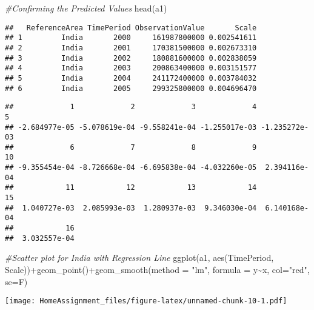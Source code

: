 \documentclass[
]{article}
\newenvironment{Shaded}{\begin{snugshade}}{\end{snugshade}}
\newcommand{\AttributeTok}[1]{\textcolor[rgb]{0.77,0.63,0.00}{#1}}
\newcommand{\CommentTok}[1]{\textcolor[rgb]{0.56,0.35,0.01}{\textit{#1}}}
\newcommand{\FunctionTok}[1]{\textcolor[rgb]{0.00,0.00,0.00}{#1}}
\newcommand{\NormalTok}[1]{#1}
\newcommand{\OtherTok}[1]{\textcolor[rgb]{0.56,0.35,0.01}{#1}}
\newcommand{\SpecialCharTok}[1]{\textcolor[rgb]{0.00,0.00,0.00}{#1}}
\newcommand{\StringTok}[1]{\textcolor[rgb]{0.31,0.60,0.02}{#1}}
\begin{document}
\begin{Shaded}
\begin{Highlighting}[]
\CommentTok{\#Confirming the Predicted Values}
\FunctionTok{head}\NormalTok{(a1)}
\end{Highlighting}
\end{Shaded}

\begin{verbatim}
##   ReferenceArea TimePeriod ObservationValue       Scale
## 1         India       2000     161987800000 0.002541611
## 2         India       2001     170381500000 0.002673310
## 3         India       2002     180881600000 0.002838059
## 4         India       2003     200863400000 0.003151577
## 5         India       2004     241172400000 0.003784032
## 6         India       2005     299325800000 0.004696470
\end{verbatim}

\begin{Shaded}
\end{Shaded}

\begin{verbatim}
##             1             2             3             4             5 
## -2.684977e-05 -5.078619e-04 -9.558241e-04 -1.255017e-03 -1.235272e-03 
##             6             7             8             9            10 
## -9.355454e-04 -8.726668e-04 -6.695838e-04 -4.032260e-05  2.394116e-04 
##            11            12            13            14            15 
##  1.040727e-03  2.085993e-03  1.280937e-03  9.346030e-04  6.140168e-04 
##            16 
##  3.032557e-04
\end{verbatim}

\begin{Shaded}
\begin{Highlighting}[]
\CommentTok{\#Scatter plot for India with Regression Line}
\FunctionTok{ggplot}\NormalTok{(a1, }\FunctionTok{aes}\NormalTok{(TimePeriod, Scale))}\SpecialCharTok{+}\FunctionTok{geom\_point}\NormalTok{()}\SpecialCharTok{+}\FunctionTok{geom\_smooth}\NormalTok{(}\AttributeTok{method =} \StringTok{"lm"}\NormalTok{, }\AttributeTok{formula =}\NormalTok{ y}\SpecialCharTok{\textasciitilde{}}\NormalTok{x, }\AttributeTok{col=}\StringTok{"red"}\NormalTok{, }\AttributeTok{se=}\NormalTok{F)}
\end{Highlighting}
\end{Shaded}

\texttt{[image: HomeAssignment\_files/figure-latex/unnamed-chunk-10-1.pdf]}
\end{document}
